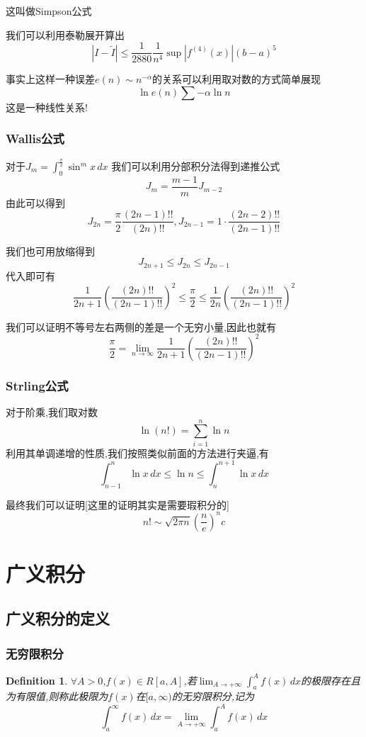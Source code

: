 \documentclass[11pt,hyperref,a4paper,UTF8]{ctexart}
\newtheorem{definition}{Definition}[subsection]
\newcommand{\parameter}[1]{\left(#1\right)}
\newcommand{\abs}[1]{\left|#1\right|}
\begin{document}
\begin{CJK}{UTF8}{gkai}
这叫做Simpson公式

我们可以利用泰勒展开算出
\[|I - \tilde{I}| \leq \dfrac{1}{2880} \dfrac{1}{n^4} \sup\abs{f^{(4)}(x)}(b - a)^5\]

事实上这样一种误差$e(n)\sim n^{-\alpha}$的关系可以利用取对数的方式简单展现
\[\ln e(n) \sum -\alpha \ln n\]
这是一种线性关系!

\subsubsection{Wallis公式}

对于$J_m = \int_{0}^{\frac{\pi}{2}}\sin^m x\, dx $
我们可以利用分部积分法得到递推公式
\[J_m = \dfrac{m - 1}{m}J_{m - 2}\]
由此可以得到
\[J_{2n} = \dfrac{\pi}{2} \dfrac{(2n - 1)!!}{(2n)!!},J_{2n - 1} = 1\cdot \dfrac{(2n - 2)!!}{(2n - 1)!!}\]

我们也可用放缩得到
\[J_{2n + 1}\leq J_{2n} \leq J_{2n - 1}\]
代入即可有
\[\dfrac{1}{2n + 1} \parameter{\dfrac{(2n)!!}{(2n - 1)!!}}^2\leq \dfrac{\pi}{2} \leq \dfrac{1}{2n} \parameter{\dfrac{(2n)!!}{(2n - 1)!!}}^2\]

我们可以证明不等号左右两侧的差是一个无穷小量,因此也就有
\[\frac{\pi}{2} = \lim_{n \to \infty} \dfrac{1}{2n + 1} \parameter{\dfrac{(2n)!!}{(2n - 1)!!}}^2\]
\subsubsection{Strling公式}

对于阶乘,我们取对数
\[\ln(n !) = \sum_{i = 1}^{n} \ln n\]
利用其单调递增的性质,我们按照类似前面的方法进行夹逼,有
\[\int_{n -1}^{n} \ln x \, dx \leq \ln n \leq \int_{n}^{n + 1} \ln x \, dx\]

最终我们可以证明[这里的证明其实是需要瑕积分的]
\[n ! \sim \sqrt{2 \pi n}\parameter{\dfrac{n}{e}}^n c\]

\section{广义积分}

\subsection{广义积分的定义}
\subsubsection{无穷限积分}
\begin{definition}
  $\forall A > 0$,$f(x) \in R[a,A]$,若$\lim_{A\to +\infty}\int_{a}^{A} f(x)\, dx$的极限存在且为有限值,则称此极限为$f(x)$在$[a,\infty)$的无穷限积分,记为
  \[\int_{a}^{\infty} f(x)\, dx = \lim_{A\to +\infty}\int_{a}^{A} f(x)\, dx\]  
\end{definition}


\end{CJK}
\end{document}
